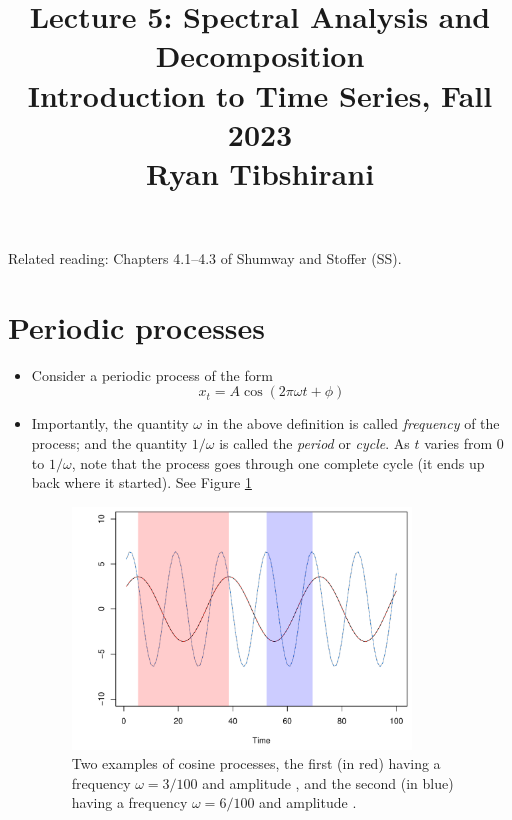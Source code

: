 \documentclass{article}
\title{Lecture 5: Spectral Analysis and Decomposition \\ \smallskip  
\large Introduction to Time Series, Fall 2023 \\ \smallskip
Ryan Tibshirani}
\date{}
\begin{document}
\maketitle
\RaggedRight
\vspace{-50pt}

Related reading: Chapters 4.1--4.3 of Shumway and Stoffer (SS).

\section{Periodic processes}

\begin{itemize}
\item Consider a periodic process of the form 
\begin{equation}
\label{eq:cos_process}
x_t = A \cos(2\pi\omega t + \phi)
\end{equation}

\item Importantly, the quantity $\omega$ in the above definition is called 
  \emph{frequency} of the process; and the quantity $1/\omega$ is called the    
  \emph{period} or \emph{cycle}. As $t$ varies from $0$ to $1/\omega$, note that
  the process goes through one complete cycle (it ends up back where it
  started). See Figure \ref{fig:cos_process} 

\begin{figure}[htb]
\centering
\includegraphics[width=0.85\textwidth]{fig/cos-process-1.pdf}
\caption{Two examples of cosine processes, the first (in red) having a frequency  
  $\omega = 3/100$ and amplitude , and the
  second (in blue) having a frequency $\omega = 6/100$ and amplitude
  .} 
\label{fig:cos_process}
\end{figure}


\end{itemize}
\end{document}
